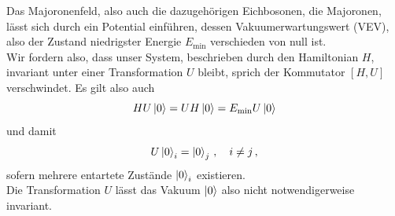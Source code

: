 Das Majoronenfeld, also auch die dazugehörigen Eichbosonen, die Majoronen, lässt sich durch ein Potential einführen, dessen Vakuumerwartungswert (VEV), also der Zustand niedrigster Energie $E_\text{min}$ verschieden von null ist. \\
Wir fordern also, dass unser System, beschrieben durch den Hamiltonian $H$, invariant unter einer Transformation $U$ bleibt, sprich der Kommutator $[H, U]$ verschwindet.
Es gilt also auch
\begin{equation*}
    H U \ket{0} = U H \ket{0} = E_\text{min} U  \ket{0} 
\end{equation*}
und damit
\begin{equation*}
    U \ket{0}_i = \ket{0}_j \,, \quad i \neq j \,,
\end{equation*}
sofern mehrere entartete Zustände $\ket{0}_i$ existieren. \\
Die Transformation $U$ lässt das Vakuum $\ket{0}$ also nicht notwendigerweise invariant.

